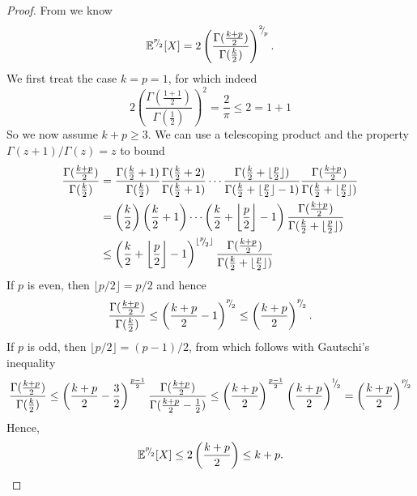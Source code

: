 \documentclass[12pt]{article}
\begin{document}
\begin{proof}
    From \cite[Theorem 3.3.2]{hogg-2013-introduction-mathematical} we know
    \begin{equation}
        \mathbb{E}^{{}^{p}{\mskip -5mu/\mskip -3mu}_{2}}[X] = 2 \left( \frac{\Gamma(\frac{k + p}{2})}{\Gamma(\frac{k}{2})} \right)^{{}^{2}{\mskip -5mu/\mskip -3mu}_{p}}.
    \end{equation}
    We first treat the case $k=p=1$, for which indeed
    \begin{equation}
        2 \left( \frac{\Gamma(\frac{1+1}{2})}{\Gamma(\frac{1}{2})} \right)^2 = \frac{2}{\pi} \leq 2 = 1 + 1
    \end{equation}
    So we now assume $k + p \geq 3$. We can use a telescoping product and the property $\Gamma(z+1)/\Gamma(z) = z$ to bound
    \begin{align}
        \frac{\Gamma(\frac{k + p}{2})}{\Gamma(\frac{k}{2})} 
        &= \frac{\Gamma(\frac{k}{2} + 1)}{\Gamma(\frac{k}{2})} \frac{\Gamma(\frac{k}{2} + 2)}{\Gamma(\frac{k}{2} + 1)} \cdots \frac{\Gamma(\frac{k}{2} + \lfloor \frac{p}{2} \rfloor)}{\Gamma(\frac{k}{2} + \lfloor \frac{p}{2} \rfloor - 1)} \frac{\Gamma( \frac{k + p}{2})}{\Gamma(\frac{k}{2} + \lfloor \frac{p}{2} \rfloor)} \notag \\
        &= \left(\frac{k}{2}\right) \left(\frac{k}{2} + 1\right) \cdots \left( \frac{k}{2} + \bigg\lfloor \frac{p}{2} \bigg\rfloor - 1 \right) \frac{\Gamma( \frac{k + p}{2})}{\Gamma(\frac{k}{2} + \lfloor \frac{p}{2} \rfloor)} \notag \\
        &\leq \left(\frac{k}{2} + \bigg\lfloor \frac{p}{2} \bigg\rfloor - 1\right)^{\lfloor {}^{p}{\mskip -5mu/\mskip -3mu}_{2} \rfloor} \frac{\Gamma( \frac{k + p}{2})}{\Gamma(\frac{k}{2} + \lfloor \frac{p}{2} \rfloor)}
    \end{align}
    If $p$ is even, then $\lfloor p/2 \rfloor = p/2$ and hence
    \begin{equation}
        \frac{\Gamma(\frac{k + p}{2})}{\Gamma(\frac{k}{2})} 
        \leq \left( \frac{k + p}{2} - 1 \right)^{{}^{p}{\mskip -5mu/\mskip -3mu}_{2}}
        \leq \left( \frac{k + p}{2}\right)^{{}^{p}{\mskip -5mu/\mskip -3mu}_{2}}.
    \end{equation}
    If $p$ is odd, then $\lfloor p/2 \rfloor = (p - 1)/2$, from which follows with Gautschi's inequality \cite{kershaw-1983-extensions-gautschi}
    \begin{equation}
        \frac{\Gamma(\frac{k + p}{2})}{\Gamma(\frac{k}{2})}
        \leq \left(\frac{k + p}{2} - \frac{3}{2} \right)^{ \frac{p - 1}{2}} \frac{\Gamma( \frac{k + p}{2})}{\Gamma(\frac{k + p}{2} - \frac{1}{2})}
        \leq \left(\frac{k + p}{2}\right)^{ \frac{p - 1}{2}} \left(\frac{k + p}{2}\right)^{{}^{1}{\mskip -5mu/\mskip -3mu}_{2}}
        = \left(\frac{k + p}{2}\right)^{ {}^{p}{\mskip -5mu/\mskip -3mu}_{2}}
    \end{equation}
    Hence,
    \begin{equation}
        \mathbb{E}^{{}^{p}{\mskip -5mu/\mskip -3mu}_{2}}[X] \leq 2 \left( \frac{k + p}{2} \right) \leq k + p.
    \end{equation}
\end{proof}
\end{document}
